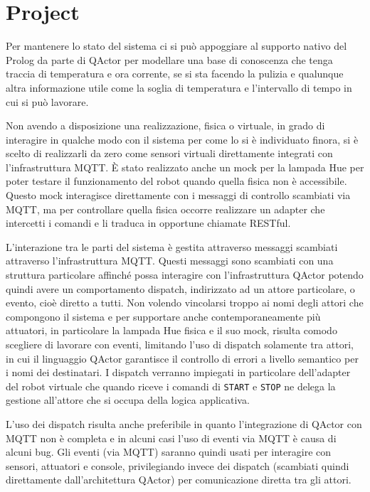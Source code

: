 \section{Project}
Per mantenere lo stato del sistema ci si può appoggiare al supporto nativo del Prolog da parte di QActor per modellare una base di conoscenza che tenga traccia di temperatura e ora corrente, se si sta facendo la pulizia e qualunque altra informazione utile come la soglia di temperatura e l'intervallo di tempo in cui si può lavorare.

Non avendo a disposizione una realizzazione, fisica o virtuale, in grado di interagire in qualche modo con il sistema per come lo si è individuato finora, si è scelto di realizzarli da zero come sensori virtuali direttamente integrati con l'infrastruttura MQTT. È stato realizzato anche un mock per la lampada Hue per poter testare il funzionamento del robot quando quella fisica non è accessibile. Questo mock interagisce direttamente con i messaggi di controllo scambiati via MQTT, ma per controllare quella fisica occorre realizzare un adapter che intercetti i comandi e li traduca in opportune chiamate RESTful.

L'interazione tra le parti del sistema è gestita attraverso messaggi scambiati attraverso l'infrastruttura MQTT. Questi messaggi sono scambiati con una struttura particolare affinché possa interagire con l'infrastruttura QActor potendo quindi avere un comportamento dispatch, indirizzato ad un attore particolare, o evento, cioè diretto a tutti. Non volendo vincolarsi troppo ai nomi degli attori che compongono il sistema e per supportare anche contemporaneamente più attuatori, in particolare la lampada Hue fisica e il suo mock, risulta comodo scegliere di lavorare con eventi, limitando l'uso di dispatch solamente tra attori, in cui il linguaggio QActor garantisce il controllo di errori a livello semantico per i nomi dei destinatari. I dispatch verranno impiegati in particolare dell'adapter del robot virtuale che quando riceve i comandi di \texttt{START} e \texttt{STOP} ne delega la gestione all'attore che si occupa della logica applicativa.

L'uso dei dispatch risulta anche preferibile in quanto l'integrazione di QActor con MQTT non è completa e in alcuni casi l'uso di eventi via MQTT è causa di alcuni bug. Gli eventi (via MQTT) saranno quindi usati per interagire con sensori, attuatori e console, privilegiando invece dei dispatch (scambiati quindi direttamente dall'architettura QActor) per comunicazione diretta tra gli attori.

